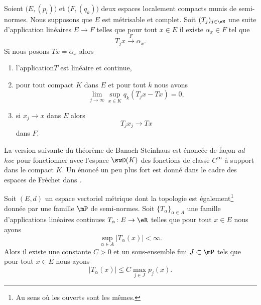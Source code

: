 \begin{corollary}   \label{CorPGwLluz}
    Soient \( \big( E,(p_l) \big)\) et \( \big( F,(q_k) \big)\) deux espaces localement compacts munis de semi-normes. Nous supposons que \( E\) est métrisable et complet. Soit \( (T_j)_{j\in \eN}\) une suite d'application linéaires \( E\to F\) telles que pour tout \( x\in E\) il existe \( \alpha_x\in F\) tel que
    \begin{equation}
        T_jx\stackrel{F}{\longrightarrow}\alpha_x.
    \end{equation}
    Si nous posons \( Tx=\alpha_x\) alors
    \begin{enumerate}
        \item   \label{ItemAEOtOMLi}
            l'application\( T\) est linéaire et continue,
        \item
            pour tout compact \( K\) dans \( E\) et pour tout \( k\) nous avons
            \begin{equation}
                \lim_{j\to \infty} \sup_{x\in K}q_k(T_jx-Tx)=0,
            \end{equation}
        \item   \label{ItemAEOtOMLiii}
            si \( x_j\to x\) dans \( E\) alors
            \begin{equation}
                T_jx_j\to Tx
            \end{equation}
            dans \( F\).
    \end{enumerate}
\end{corollary}

La version suivante du théorème de Banach-Steinhaus est énoncée de façon \emph{ad hoc} pour fonctionner avec l'espace \( \swD(K)\) des fonctions de classe \(  C^{\infty}\) à support dans le compact \( K\). Un énoncé un peu plus fort est donné dans le cadre des espaces de Fréchet dans \cite{TQSWRiz}.
\begin{theorem}  \label{ThoNBrmGIg}
    Soit \( (E,d)\) un espace vectoriel métrique dont la topologie est également\footnote{Au sens où les ouverts sont les mêmes.} donnée par une famille \( \mP\) de semi-normes. Soit \( \{ T_{\alpha} \}_{\alpha\in A}\) une famille d'applications linéaires continues \( T_{\alpha}\colon E\to \eR\) telles que pour tout \( x\in E\) nous ayons
    \begin{equation}
        \sup_{\alpha\in A}\big| T_{\alpha}(x) \big|<\infty.
    \end{equation}
    Alors il existe une constante \( C>0\) et un sous-ensemble fini \( J\subset \mP\) tels que pour tout \( x\in E\) nous ayons
    \begin{equation}
        \big| T_{\alpha} (x)\big|\leq C\max_{j\in J}p_j(x).
    \end{equation}
\end{theorem}

